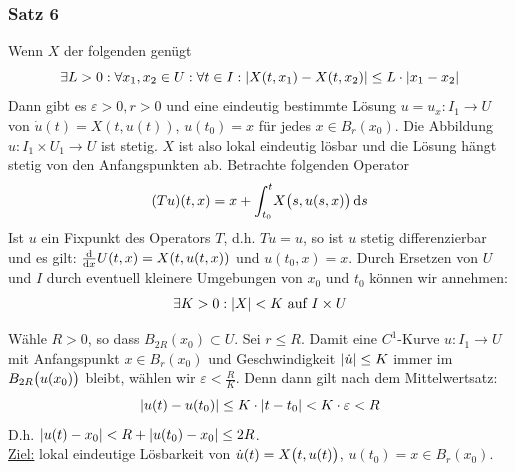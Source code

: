 \subsubsection[Satz 6: (Picard-Lindelöf)]{Satz 6} %
\label{ssub:231}
Wenn $X$ der folgenden  genügt 
\[
	\exists L >0 : \forall x_1, x_2 \in U : \forall t \in I : \abs*{X(t,x_1) - X(t,x_2)} \le L \cdot \abs*{x_1 - x_2}  
\]
Dann gibt es $\varepsilon>0, r>0$ und eine eindeutig bestimmte Lösung $u=u_x : I_1 \to U$ von $\dot u (t) = X(t, u(t))$, $u(t_0) =x$ für jedes $x \in B_r(x_0)$. Die 
Abbildung $u : I_1 \times U_1 \to U$ ist stetig.
$X$ ist also lokal eindeutig lösbar und die Lösung hängt stetig von den Anfangspunkten ab.
Betrachte folgenden Operator
\[
	(T u) (t,x) = x + \int_{t_0} ^{t} \! X\enbrace[\big]{s, u (s,x)}  \, \mathrm{d}s
\]
Ist $u$ ein Fixpunkt des Operators $T$, d.h. $T u = u$, so ist $u$ stetig differenzierbar und es gilt: $\diffd{}{x} U(t,x) = X (t, u(t,x))$ und $u(t_0,x) =x$. Durch
Ersetzen von $U$ und $I$ durch eventuell kleinere Umgebungen von $x_0$ und $t_0$ können wir annehmen: 
\[
	\exists K>0 : \abs*{X} < K \text{ auf } I \times U 
\]
\begin{figure}[ht]
\end{figure}
Wähle $R>0$, so dass $B_{2R}(x_0) \subset U$. Sei $r \le R$. Damit eine $C^1$-Kurve $u : I_1 \to U$ mit Anfangspunkt $x \in B_r(x_0)$ und Geschwindigkeit 
$\abs*{\dot u} \le K $ immer im $B_{2R}\enbrace[\big]{u(x_0)}$ bleibt, wählen wir $\varepsilon < \frac{R}{K}$. Denn dann gilt nach dem Mittelwertsatz: 
\[
	\abs*{u(t) - u(t_0)} \le K \cdot \abs*{t- t_0} < K \cdot \varepsilon < R  
\]
D.h. $\abs*{u(t) - x_0} < R + \abs*{u(t_0)- x_0} \le 2 R$.\\
\uline{Ziel:} lokal eindeutige Lösbarkeit von $\dot u(t) = X\enbrace[\big]{t,u(t)}$, $u(t_0) =x \in B_r(x_0)$.

